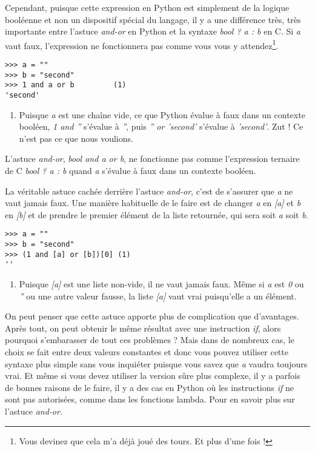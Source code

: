 Cependant, puisque cette expression en Python est simplement de la logique booléenne et non un dispositif spécial du langage, il y a une différence très, très importante entre l’astuce \emph{and-or} en Python et la syntaxe \emph{bool ? a : b} en C. Si \emph{a} vaut faux, l’expression ne fonctionnera pas comme vous vous y attendez\footnote{Vous devinez que cela m’a déjà joué des tours. Et plus d’une fois !}.

\begin{example}
\begin{lstlisting}
>>> a = ""
>>> b = "second"
>>> 1 and a or b         (1)
'second'
\end{lstlisting}
\end{example}

\begin{enumerate}
    \item{Puisque \emph{a} est une chaîne vide, ce que Python évalue à faux dans un contexte booléen, \emph{1 and ''} s’évalue à \emph{''}, puis \emph{'' or 'second'} s’évalue à \emph{'second'}. Zut ! Ce n’est pas ce que nous voulions.}
\end{enumerate}

L’astuce \emph{and-or}, \emph{bool and a or b}, ne fonctionne pas comme l’expression ternaire de C \emph{bool ? a : b} quand \emph{a} s’évalue à faux dans un contexte booléen.

La véritable astuce cachée derrière l’astuce \emph{and-or}, c’est de s’assurer que \emph{a} ne vaut jamais faux. Une manière habituelle de le faire est de changer \emph{a} en \emph{[a]} et \emph{b} en \emph{[b]} et de prendre le premier élément de la liste retournée, qui sera soit \emph{a} soit \emph{b}.

\begin{example}
\begin{lstlisting}
>>> a = ""
>>> b = "second"
>>> (1 and [a] or [b])[0] (1)
''
\end{lstlisting}
\end{example}

\begin{enumerate}
    \item Puisque \emph{[a]} est une liste non-vide, il ne vaut jamais faux. Même si \emph{a} est \emph{0} ou \emph{''} ou une autre valeur fausse, la liste \emph{[a]} vaut vrai puisqu’elle a un élément.
\end{enumerate}

\medskip
On peut penser que cette astuce apporte plus de complication que d’avantages. Après tout, on peut obtenir le même résultat avec une instruction \emph{if}, alors pourquoi s’embarasser de tout ces problèmes ? Mais dans de nombreux cas, le choix se fait entre deux valeurs constantes et donc vous pouvez utiliser cette syntaxe plus simple sans vous inquiéter puisque vous savez que \emph{a} vaudra toujours vrai. Et même si vous devez utiliser la version sûre plus complexe, il y a parfois de bonnes raisons de le faire, il y a des cas en Python où les instructions \emph{if} ne sont pas autorisées, comme dans les fonctions lambda. Pour en savoir plus sur l'astuce \emph{and-or}.

